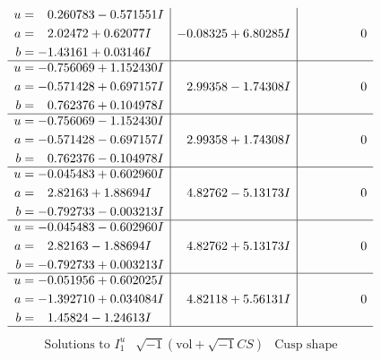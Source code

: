 \documentclass[1p]{elsarticle_modified}
\theoremstyle{definition}
\newcommand{\I}{\sqrt{-1}}
\begin{document}
$$\begin{array}{c|c|c}
\begin{aligned}
u &= \phantom{-}0.260783 - 0.571551 I \\
a &= \phantom{-}2.02472 + 0.62077 I \\
b &= -1.43161 + 0.03146 I\end{aligned}
 & -0.08325 + 6.80285 I & \phantom{-0.000000 } 0 \\ \hline\begin{aligned}
u &= -0.756069 + 1.152430 I \\
a &= -0.571428 + 0.697157 I \\
b &= \phantom{-}0.762376 + 0.104978 I\end{aligned}
 & \phantom{-}2.99358 - 1.74308 I & \phantom{-0.000000 } 0 \\ \hline\begin{aligned}
u &= -0.756069 - 1.152430 I \\
a &= -0.571428 - 0.697157 I \\
b &= \phantom{-}0.762376 - 0.104978 I\end{aligned}
 & \phantom{-}2.99358 + 1.74308 I & \phantom{-0.000000 } 0 \\ \hline\begin{aligned}
u &= -0.045483 + 0.602960 I \\
a &= \phantom{-}2.82163 + 1.88694 I \\
b &= -0.792733 - 0.003213 I\end{aligned}
 & \phantom{-}4.82762 - 5.13173 I & \phantom{-0.000000 } 0 \\ \hline\begin{aligned}
u &= -0.045483 - 0.602960 I \\
a &= \phantom{-}2.82163 - 1.88694 I \\
b &= -0.792733 + 0.003213 I\end{aligned}
 & \phantom{-}4.82762 + 5.13173 I & \phantom{-0.000000 } 0 \\ \hline\begin{aligned}
u &= -0.051956 + 0.602025 I \\
a &= -1.392710 + 0.034084 I \\
b &= \phantom{-}1.45824 - 1.24613 I\end{aligned}
 & \phantom{-}4.82118 + 5.56131 I & \phantom{-0.000000 } 0\\
 \hline 
 \end{array}$$\newpage$$\begin{array}{c|c|c}  
\text{Solutions to }I^u_{1}& \I (\text{vol} + \sqrt{-1}CS) & \text{Cusp shape}\\
 \hline 
\begin{aligned}

\end{aligned}
\end{array}$$
\end{document}
